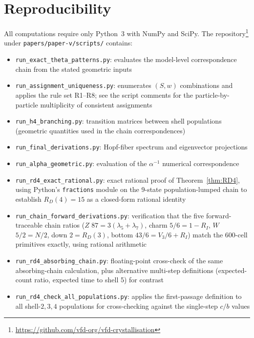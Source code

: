 \documentclass[12pt]{article}
\begin{document}
\section{Reproducibility}\label{sec:reproducibility}

All computations require only Python~3 with NumPy and SciPy. The repository\footnote{\url{https://github.com/vfd-org/vfd-crystallisation}} under \texttt{papers/paper-v/scripts/} contains:

\begin{itemize}
    \item \texttt{run\_exact\_theta\_patterns.py}: evaluates the model-level correspondence chain from the stated geometric inputs
    \item \texttt{run\_assignment\_uniqueness.py}: enumerates $(S,w)$ combinations and applies the rule set R1--R8; see the script comments for the particle-by-particle multiplicity of consistent assignments
    \item \texttt{run\_h4\_branching.py}: transition matrices between shell populations (geometric quantities used in the chain correspondences)
    \item \texttt{run\_final\_derivations.py}: Hopf-fiber spectrum and eigenvector projections
    \item \texttt{run\_alpha\_geometric.py}: evaluation of the $\alpha^{-1}$ numerical correspondence
    \item \texttt{run\_rd4\_exact\_rational.py}: exact rational proof of Theorem~\ref{thm:RD4}, using Python's \texttt{fractions} module on the 9-state population-lumped chain to establish $R_D(4) = 15$ as a closed-form rational identity
    \item \texttt{run\_chain\_forward\_derivations.py}: verification that the five forward-traceable chain ratios ($Z$ $87 = 3(\lambda_5 + \lambda_7)$, charm $5/6 = 1 - R_I$, $W$ $5/2 = N/2$, down $2 = R_D(3)$, bottom $43/6 = V_3/6 + R_I$) match the 600-cell primitives exactly, using rational arithmetic
    \item \texttt{run\_rd4\_absorbing\_chain.py}: floating-point cross-check of the same absorbing-chain calculation, plus alternative multi-step definitions (expected-count ratio, expected time to shell 5) for contrast
    \item \texttt{run\_rd4\_check\_all\_populations.py}: applies the first-passage definition to all shell-$2,3,4$ populations for cross-checking against the single-step $c/b$ values

\end{itemize}
\end{document}
